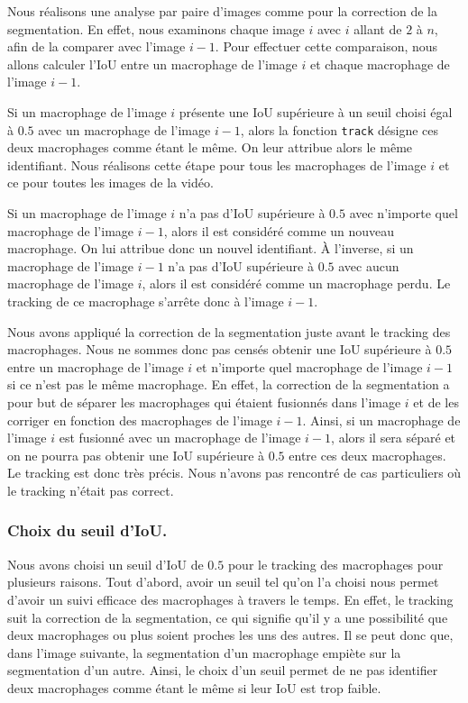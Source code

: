 \documentclass[a4paper,12pt]{report}
\begin{document}
Nous réalisons une analyse par paire d'images comme pour la correction de la segmentation. En effet, nous examinons chaque image $i$ avec $i$ allant de $2$ à $n$, afin de la comparer avec l'image $i-1$. Pour effectuer cette comparaison, nous allons calculer l'IoU entre un macrophage de l'image $i$ et chaque macrophage de l'image $i-1$.

Si un macrophage de l'image $i$ présente une IoU supérieure à un seuil choisi égal à $0.5$ avec un macrophage de l'image $i-1$, alors la fonction \texttt{track} désigne ces deux macrophages comme étant le même. On leur attribue alors le même identifiant. Nous réalisons cette étape pour tous les macrophages de l'image $i$ et ce pour toutes les images de la vidéo.

Si un macrophage de l'image $i$ n'a pas d'IoU supérieure à $0.5$ avec n'importe quel macrophage de l'image $i-1$, alors il est considéré comme un nouveau macrophage. On lui attribue donc un nouvel identifiant. À l'inverse, si un macrophage de l'image $i-1$ n'a pas d'IoU supérieure à $0.5$ avec aucun macrophage de l'image $i$, alors il est considéré comme un macrophage perdu. Le tracking de ce macrophage s'arrête donc à l'image $i-1$.

Nous avons appliqué la correction de la segmentation juste avant le tracking des macrophages. Nous ne sommes donc pas censés obtenir une IoU supérieure à $0.5$ entre un macrophage de l'image $i$ et n'importe quel macrophage de l'image $i-1$ si ce n'est pas le même macrophage. En effet, la correction de la segmentation a pour but de séparer les macrophages qui étaient fusionnés dans l'image $i$ et de les corriger en fonction des macrophages de l'image $i-1$. Ainsi, si un macrophage de l'image $i$ est fusionné avec un macrophage de l'image $i-1$, alors il sera séparé et on ne pourra pas obtenir une IoU supérieure à $0.5$ entre ces deux macrophages. Le tracking est donc très précis. Nous n'avons pas rencontré de cas particuliers où le tracking n'était pas correct.

\subsubsection*{Choix du seuil d'IoU.}
Nous avons choisi un seuil d'IoU de $0.5$ pour le tracking des macrophages pour plusieurs raisons. Tout d'abord, avoir un seuil tel qu'on l'a choisi nous permet d'avoir un suivi efficace des macrophages à travers le temps. En effet, le tracking suit la correction de la segmentation, ce qui signifie qu'il y a une possibilité que deux macrophages ou plus soient proches les uns des autres. Il se peut donc que, dans l'image suivante, la segmentation d'un macrophage empiète sur la segmentation d'un autre. Ainsi, le choix d'un seuil permet de ne pas identifier deux macrophages comme étant le même si leur IoU est trop faible.
\end{document}
